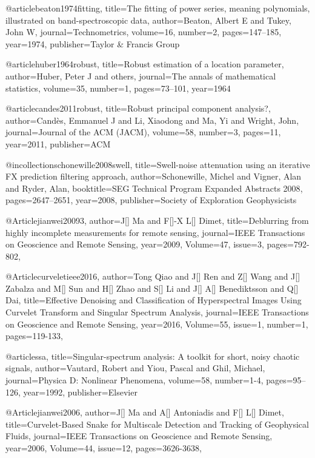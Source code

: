 @article{beaton1974fitting,
  title={The fitting of power series, meaning polynomials, illustrated on band-spectroscopic data},
  author={Beaton, Albert E and Tukey, John W},
  journal={Technometrics},
  volume={16},
  number={2},
  pages={147--185},
  year={1974},
  publisher={Taylor \& Francis Group}
}


@article{huber1964robust,
  title={Robust estimation of a location parameter},
  author={Huber, Peter J and others},
  journal={The annals of mathematical statistics},
  volume={35},
  number={1},
  pages={73--101},
  year={1964}
}
  
  
@article{candes2011robust,
  title={Robust principal component analysis?},
  author={Cand{\`e}s, Emmanuel J and Li, Xiaodong and Ma, Yi and Wright, John},
  journal={Journal of the ACM (JACM)},
  volume={58},
  number={3},
  pages={11},
  year={2011},
  publisher={ACM}
}


@incollection{schonewille2008swell,
  title={Swell-noise attenuation using an iterative FX prediction filtering approach},
  author={Schonewille, Michel and Vigner, Alan and Ryder, Alan},
  booktitle={SEG Technical Program Expanded Abstracts 2008},
  pages={2647--2651},
  year={2008},
  publisher={Society of Exploration Geophysicists}
}

@Article{jianwei20093,
  author={J[] Ma and F[]-X L[] Dimet},
  title={Deblurring from highly incomplete measurements for remote sensing},
  journal={IEEE Transactions on Geoscience and Remote Sensing},
  year=2009,
  Volume=47,
  issue=3,
  pages={792-802},
}

@Article{curveletieee2016,
  author={Tong Qiao and J[] Ren and Z[] Wang and J[] Zabalza and M[] Sun and H[] Zhao and S[] Li and J[] A[] Benediktsson and Q[] Dai},
  title={Effective Denoising and Classification of Hyperspectral Images Using Curvelet Transform and Singular Spectrum Analysis},
  journal={IEEE Transactions on Geoscience and Remote Sensing},
  year=2016,
  Volume=55,
  issue=1,
  number=1,
  pages={119-133},
}

@article{ssa,
  title={Singular-spectrum analysis: A toolkit for short, noisy chaotic signals},
  author={Vautard, Robert and Yiou, Pascal and Ghil, Michael},
  journal={Physica D: Nonlinear Phenomena},
  volume={58},
  number={1-4},
  pages={95--126},
  year={1992},
  publisher={Elsevier}
}


@Article{jianwei2006,
  author={J[] Ma and A[] Antoniadis and F[] L[] Dimet},
  title={Curvelet-Based Snake for Multiscale Detection and Tracking of Geophysical Fluids},
  journal={IEEE Transactions on Geoscience and Remote Sensing},
  year=2006,
  Volume=44,
  issue=12,
  pages={3626-3638},
}

